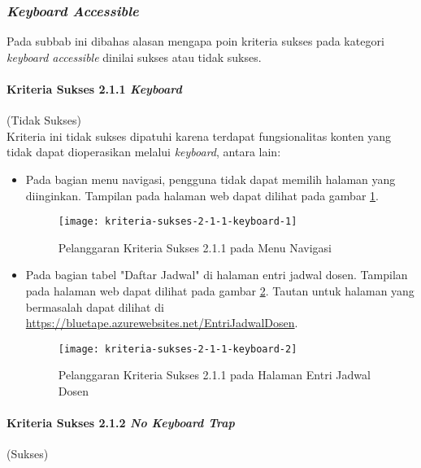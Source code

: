\subsubsection{\textit{Keyboard Accessible}}
\label{subsubsec:kepatuhan_bluetape_keyboard_accessible}
Pada subbab ini dibahas alasan mengapa poin kriteria sukses pada kategori \textit{keyboard accessible} dinilai sukses atau tidak sukses.

\paragraph{Kriteria Sukses 2.1.1 \textit{Keyboard}}
\label{par:kepatuhan_bluetape_kriteria_sukses_2.1.1}
(Tidak Sukses)\\

Kriteria ini tidak sukses dipatuhi karena terdapat fungsionalitas konten yang tidak dapat dioperasikan melalui \textit{keyboard}, antara lain:

\begin{itemize}
    \item Pada bagian menu navigasi, pengguna tidak dapat memilih halaman yang diinginkan. Tampilan pada halaman web dapat dilihat pada gambar \ref{fig:2.1.1_keyboard_1}.
    \begin{figure}[H]
        \centering  
        \texttt{[image: kriteria-sukses-2-1-1-keyboard-1]}  
        \caption[Pelanggaran Kriteria Sukses 2.1.1 pada Menu Navigasi]{Pelanggaran Kriteria Sukses 2.1.1 pada Menu Navigasi}
        \label{fig:2.1.1_keyboard_1}  
    \end{figure} 

    \item Pada bagian tabel "Daftar Jadwal" di halaman entri jadwal dosen. Tampilan pada halaman web dapat dilihat pada gambar \ref{fig:2.1.1_keyboard_2}. Tautan untuk halaman yang bermasalah dapat dilihat di \url{https://bluetape.azurewebsites.net/EntriJadwalDosen}.
    \begin{figure}[H]
        \centering  
        \texttt{[image: kriteria-sukses-2-1-1-keyboard-2]}  
        \caption[Pelanggaran Kriteria Sukses 2.1.1 pada Halaman Entri Jadwal Dosen]{Pelanggaran Kriteria Sukses 2.1.1 pada Halaman Entri Jadwal Dosen}
        \label{fig:2.1.1_keyboard_2}  
    \end{figure} 
\end{itemize}

\paragraph{Kriteria Sukses 2.1.2 \textit{No Keyboard Trap}}
\label{par:kepatuhan_bluetape_kriteria_sukses_2.1.2}
(Sukses)\\

